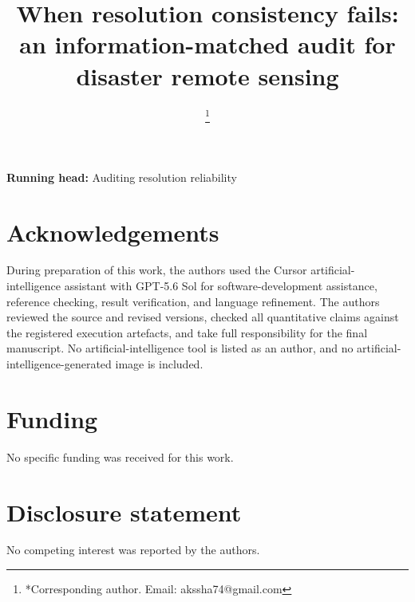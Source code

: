 \documentclass[]{interact}
\begin{document}

\title{When resolution consistency fails: an information-matched audit for disaster remote sensing}

\author{
\thanks{*Corresponding author. Email: akssha74@gmail.com}
}

\maketitle

\noindent\textbf{Running head:} Auditing resolution reliability
\par\medskip

\begin{abstract}

\end{abstract}










\section*{Acknowledgements}
During preparation of this work, the authors used the Cursor artificial-intelligence assistant with GPT-5.6 Sol for software-development assistance, reference checking, result verification, and language refinement. The authors reviewed the source and revised versions, checked all quantitative claims against the registered execution artefacts, and take full responsibility for the final manuscript. No artificial-intelligence tool is listed as an author, and no artificial-intelligence-generated image is included.

\section*{Funding}
No specific funding was received for this work.

\section*{Disclosure statement}
No competing interest was reported by the authors.
\end{document}
